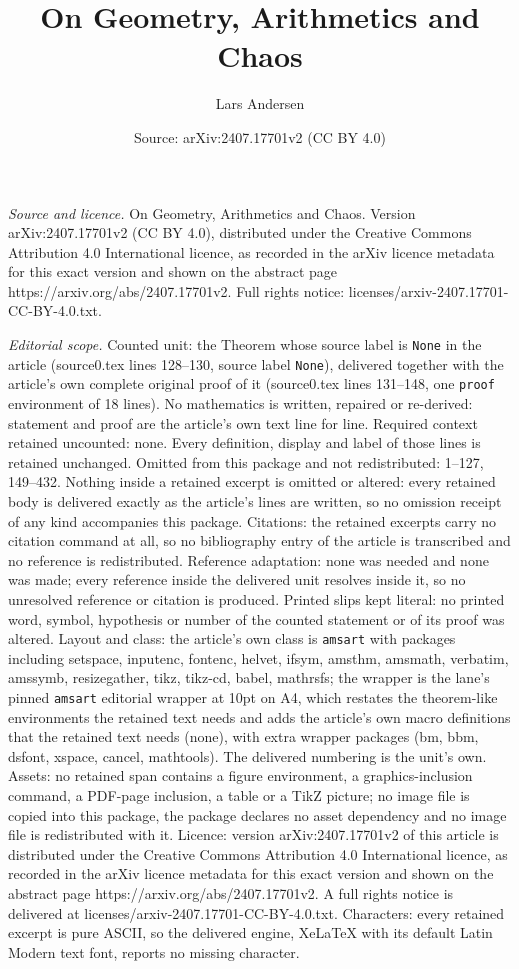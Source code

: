 \documentclass[10pt,a4paper]{amsart}
\title[On Geometry, Arithmetics and Chaos]{On Geometry, Arithmetics and Chaos}
\author{Lars Andersen}
\date{Source: arXiv:2407.17701v2 (CC BY 4.0)}
\begin{document}
\maketitle

\noindent\emph{Source and licence.} On Geometry, Arithmetics and Chaos. Version arXiv:2407.17701v2 (CC BY 4.0), distributed under the Creative Commons Attribution 4.0 International licence, as recorded in the arXiv licence metadata for this exact version and shown on the abstract page https://arxiv.org/abs/2407.17701v2. Full rights notice: licenses/arxiv-2407.17701-CC-BY-4.0.txt.\par\smallskip

\noindent\textit{Editorial scope.} Counted unit: the Theorem whose source label is \texttt{None} in the article (source0.tex lines 128--130, source label \texttt{None}), delivered together with the article's own complete original proof of it (source0.tex lines 131--148, one \texttt{proof} environment of 18 lines). No mathematics is written, repaired or re-derived: statement and proof are the article's own text line for line. Required context retained uncounted: none. Every definition, display and label of those lines is retained unchanged. Omitted from this package and not redistributed: 1--127, 149--432. Nothing inside a retained excerpt is omitted or altered: every retained body is delivered exactly as the article's lines are written, so no omission receipt of any kind accompanies this package. Citations: the retained excerpts carry no citation command at all, so no bibliography entry of the article is transcribed and no reference is redistributed. Reference adaptation: none was needed and none was made; every reference inside the delivered unit resolves inside it, so no unresolved reference or citation is produced. Printed slips kept literal: no printed word, symbol, hypothesis or number of the counted statement or of its proof was altered. Layout and class: the article's own class is \texttt{amsart} with packages including setspace, inputenc, fontenc, helvet, ifsym, amsthm, amsmath, verbatim, amssymb, resizegather, tikz, tikz-cd, babel, mathrsfs; the wrapper is the lane's pinned \texttt{amsart} editorial wrapper at 10pt on A4, which restates the theorem-like environments the retained text needs and adds the article's own macro definitions that the retained text needs (none), with extra wrapper packages (bm, bbm, dsfont, xspace, cancel, mathtools). The delivered numbering is the unit's own. Assets: no retained span contains a figure environment, a graphics-inclusion command, a PDF-page inclusion, a table or a TikZ picture; no image file is copied into this package, the package declares no asset dependency and no image file is redistributed with it. Licence: version arXiv:2407.17701v2 of this article is distributed under the Creative Commons Attribution 4.0 International licence, as recorded in the arXiv licence metadata for this exact version and shown on the abstract page https://arxiv.org/abs/2407.17701v2. A full rights notice is delivered at licenses/arxiv-2407.17701-CC-BY-4.0.txt. Characters: every retained excerpt is pure ASCII, so the delivered engine, XeLaTeX with its default Latin Modern text font, reports no missing character.
\end{document}
